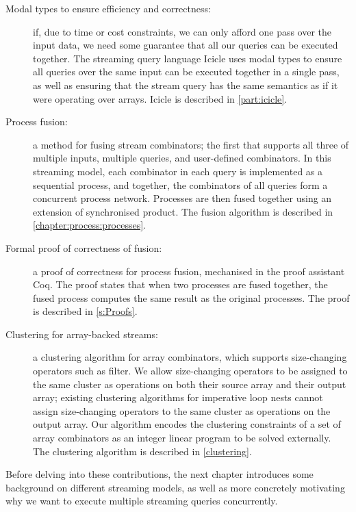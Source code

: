 \begin{description}
\item[Modal types to ensure efficiency and correctness:]
if, due to time or cost constraints, we can only afford one pass over the input data, we need some guarantee that all our queries can be executed together.
The streaming query language Icicle uses modal types to ensure all queries over the same input can be executed together in a single pass, as well as ensuring that the stream query has the same semantics as if it were operating over arrays.
Icicle is described in \cref{part:icicle}.


\item[Process fusion:]
a method for fusing stream combinators; the first that supports all three of multiple inputs, multiple queries, and user-defined combinators.
In this streaming model, each combinator in each query is implemented as a sequential process, and together, the combinators of all queries form a concurrent process network.
Processes are then fused together using an extension of synchronised product.
The fusion algorithm is described in \cref{chapter:process:processes}.

\item[Formal proof of correctness of fusion:]
a proof of correctness for process fusion, mechanised in the proof assistant Coq.
The proof states that when two processes are fused together, the fused process computes the same result as the original processes.
The proof is described in \cref{s:Proofs}.

\item[Clustering for array-backed streams:]
a clustering algorithm for array combinators, which supports size-changing operators such as filter.
We allow size-changing operators to be assigned to the same cluster as operations on both their source array and their output array; existing clustering algorithms for imperative loop nests cannot assign size-changing operators to the same cluster as operations on the output array.
Our algorithm encodes the clustering constraints of a set of array combinators as an integer linear program to be solved externally.
The clustering algorithm is described in \cref{clustering}.

\end{description}

Before delving into these contributions, the next chapter introduces some background on different streaming models, as well as more concretely motivating why we want to execute multiple streaming queries concurrently.

